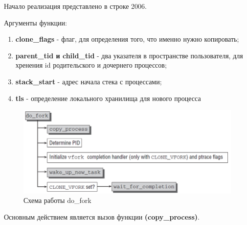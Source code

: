 Начало реализация представлено в строке 2006.

Аргументы функции:
\begin{enumerate}
\item \textbf{clone\_flags} - флаг, для определения того, что именно нужно копировать;
\item \textbf{parent\_tid и child\_tid} - два указателя в пространстве пользователя, для хренения id родительского и дочернего процессов;
\item \textbf{stack\_start} - адрес начала стека с процессами;
\item \textbf{tls} - определение локального хранилища для нового процесса
\end{enumerate}
\begin{figure}[H]
  \centering
  \includegraphics[width=\textwidth]{img/do_fork}
  \caption{Схема работы do\_fork}
\end{figure}
Основным действием является вызов функции \textbf{(copy\_process)}.

